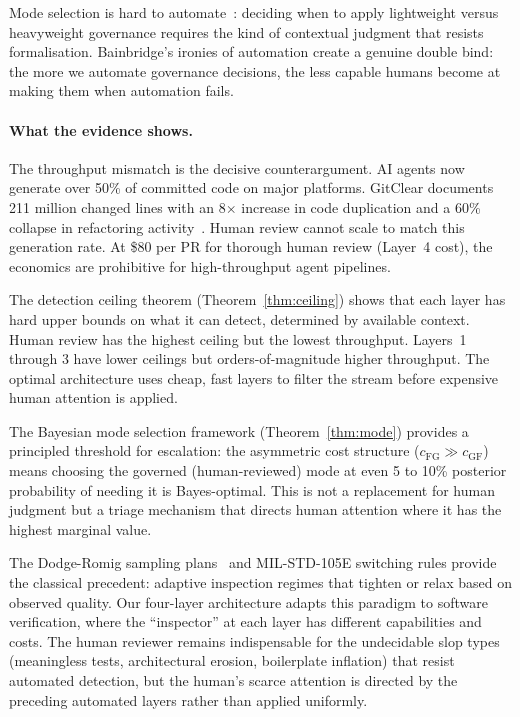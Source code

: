 Mode selection is hard to automate~\citep{bainbridge1983ironies}: deciding when to apply lightweight versus heavyweight governance requires the kind of contextual judgment that resists formalisation. Bainbridge's ironies of automation create a genuine double bind: the more we automate governance decisions, the less capable humans become at making them when automation fails.

\paragraph{What the evidence shows.}
The throughput mismatch is the decisive counterargument. AI agents now generate over 50\% of committed code on major platforms. GitClear documents 211 million changed lines with an 8$\times$ increase in code duplication and a 60\% collapse in refactoring activity~\citep{gitclear2025}. Human review cannot scale to match this generation rate. At \$80 per PR for thorough human review (Layer~4 cost), the economics are prohibitive for high-throughput agent pipelines.

The detection ceiling theorem (Theorem~\ref{thm:ceiling}) shows that each layer has hard upper bounds on what it can detect, determined by available context. Human review has the highest ceiling but the lowest throughput. Layers~1 through 3 have lower ceilings but orders-of-magnitude higher throughput. The optimal architecture uses cheap, fast layers to filter the stream before expensive human attention is applied.

The Bayesian mode selection framework (Theorem~\ref{thm:mode}) provides a principled threshold for escalation: the asymmetric cost structure ($c_{\mathrm{FG}} \gg c_{\mathrm{GF}}$) means choosing the governed (human-reviewed) mode at even 5 to 10\% posterior probability of needing it is Bayes-optimal. This is not a replacement for human judgment but a triage mechanism that directs human attention where it has the highest marginal value.

The Dodge-Romig sampling plans~\citep{dodge1929method} and MIL-STD-105E switching rules provide the classical precedent: adaptive inspection regimes that tighten or relax based on observed quality. Our four-layer architecture adapts this paradigm to software verification, where the ``inspector'' at each layer has different capabilities and costs. The human reviewer remains indispensable for the undecidable slop types (meaningless tests, architectural erosion, boilerplate inflation) that resist automated detection, but the human's scarce attention is directed by the preceding automated layers rather than applied uniformly.


